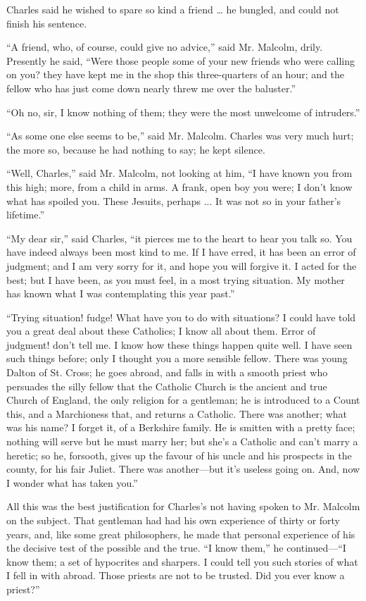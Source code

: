 Charles said he wished to spare so kind a friend … he bungled,
and could not finish his sentence.

``A friend, who, of course, could give no advice,'' said
Mr. Malcolm, drily. Presently he said, ``Were those people some of
your new friends who were calling on you? they have kept me in the
shop this three-quarters of an hour; and the fellow who has just come
down nearly threw me over the baluster.''

``Oh no, sir, I know nothing of them; they were the most
unwelcome of intruders.''

``As some one else seems to be,'' said Mr. Malcolm. Charles
was very much hurt; the more so, because he had nothing to say; he
kept silence.

``Well, Charles,'' said Mr. Malcolm, not looking at him,
``I have known you from this high; more, from a child in arms. A
frank, open boy you were; I don't know what has spoiled you. These
Jesuits, perhaps ... It was not so in your father's lifetime.''

``My dear sir,'' said Charles, ``it pierces me to the
heart to hear you talk so. You have indeed always been most kind to
me. If I have erred, it has been an error of judgment; and I am very
sorry for it, and hope you will forgive it. I acted for the best; but
I have been, as you must feel, in a most trying situation. My mother
has known what I was contemplating this year past.''

``Trying situation! fudge! What have you to do with situations?
I could have told you a great deal about these Catholics; I know all
about them. Error of judgment! don't tell me. I know how these things
happen quite well. I have seen such things before; only I thought you
a more sensible fellow. There was young Dalton of St. Cross; he goes
abroad, and falls in with a smooth priest who persuades the silly
fellow that the Catholic Church is the ancient and true Church of
England, the only religion for a gentleman; he is introduced to a
Count this, and a Marchioness that, and returns a Catholic. There was
another; what was his name? I forget it, of a Berkshire family. He is
smitten with a pretty face; nothing will serve but he must marry
her; but she's a Catholic and can't marry a heretic; so he, forsooth,
gives up the favour of his uncle and his prospects in the county, for
his fair Juliet. There was another—but it's useless going on. And,
now I wonder what has taken you.''

All this was the best justification for Charles's not having spoken
to Mr. Malcolm on the subject. That gentleman had had his own
experience of thirty or forty years, and, like some great
philosophers, he made that personal experience of his the decisive
test of the possible and the true. ``I know them,'' he
continued—``I know them; a set of hypocrites and sharpers. I
could tell you such stories of what I fell in with abroad. Those
priests are not to be trusted. Did you ever know a priest?''

